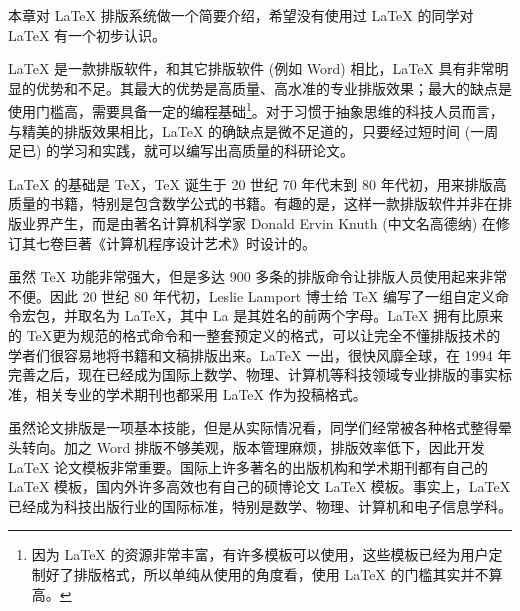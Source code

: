 


本章对 \LaTeX{} 排版系统做一个简要介绍，希望没有使用过 \LaTeX{} 的同学对 \LaTeX{} 有一个初步认识。



\LaTeX{} 是一款排版软件，和其它排版软件 (例如 Word) 相比，\LaTeX{} 具有非常明显的优势和不足。其最大的优势是高质量、高水准的专业排版效果；最大的缺点是使用门槛高，需要具备一定的编程基础\footnote{因为 \LaTeX{} 的资源非常丰富，有许多模板可以使用，这些模板已经为用户定制好了排版格式，所以单纯从使用的角度看，使用 \LaTeX{} 的门槛其实并不算高。}。对于习惯于抽象思维的科技人员而言，与精美的排版效果相比，\LaTeX{} 的确缺点是微不足道的，只要经过短时间 (一周足已) 的学习和实践，就可以编写出高质量的科研论文。

\LaTeX{} 的基础是 \TeX，\TeX{} 诞生于 20 世纪 70 年代末到 80 年代初，用来排版高质量的书籍，特别是包含数学公式的书籍。有趣的是，这样一款排版软件并非在排版业界产生，而是由著名计算机科学家 Donald Ervin Knuth (中文名高德纳) 在修订其七卷巨著《计算机程序设计艺术》时设计的。

虽然 \TeX{} 功能非常强大，但是多达 900 多条的排版命令让排版人员使用起来非常不便。因此 20 世纪 80 年代初，Leslie Lamport 博士给 \TeX{} 编写了一组自定义命令宏包，并取名为 \LaTeX，其中 La 是其姓名的前两个字母。\LaTeX{} 拥有比原来的 \TeX 更为规范的格式命令和一整套预定义的格式，可以让完全不懂排版技术的学者们很容易地将书籍和文稿排版出来。\LaTeX{} 一出，很快风靡全球，在 1994 年 \LaTeXe{} 完善之后，现在已经成为国际上数学、物理、计算机等科技领域专业排版的事实标准，相关专业的学术期刊也都采用 \LaTeX{} 作为投稿格式。


虽然论文排版是一项基本技能，但是从实际情况看，同学们经常被各种格式整得晕头转向。加之 Word 排版不够美观，版本管理麻烦，排版效率低下，因此开发 \LaTeX{} 论文模板非常重要。国际上许多著名的出版机构和学术期刊都有自己的 \LaTeX{} 模板，国内外许多高效也有自己的硕博论文 \LaTeX{} 模板。事实上，\LaTeX{} 已经成为科技出版行业的国际标准，特别是数学、物理、计算机和电子信息学科。

